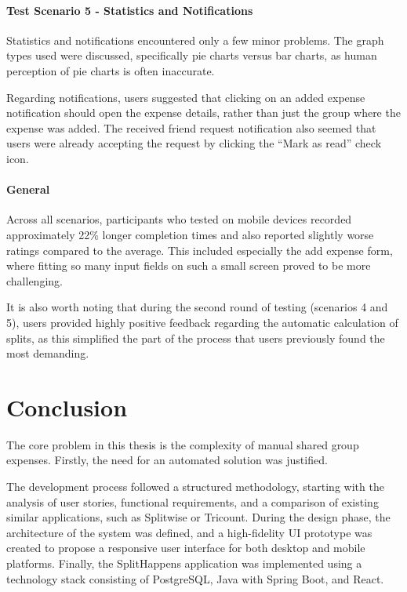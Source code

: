 \documentclass{ctuthesis}
\begin{document}
\subsubsection{Test Scenario 5 - Statistics and Notifications}

Statistics and notifications encountered only a few minor problems. The graph types used were discussed, specifically pie charts versus bar charts, as human perception of pie charts is often inaccurate. 

Regarding notifications, users suggested that clicking on an added expense notification should open the expense details, rather than just the group where the expense was added. The received friend request notification also seemed that users were already accepting the request by clicking the ``Mark as read'' check icon.

\subsubsection{General}
Across all scenarios, participants who tested on mobile devices recorded approximately 22\% longer completion times and also reported slightly worse ratings compared to the average. This included especially the add expense form, where fitting so many input fields on such a small screen proved to be more challenging.

It is also worth noting that during the second round of testing (scenarios 4 and 5), users provided highly positive feedback regarding the automatic calculation of splits, as this simplified the part of the process that users previously found the most demanding.

\chapter{Conclusion}
The core problem in this thesis is the complexity of manual shared group expenses. Firstly, the need for an automated solution was justified.

The development process followed a structured methodology, starting with the analysis of user stories, functional requirements, and a comparison of existing similar applications, such as Splitwise or Tricount. During the design phase, the architecture of the system was defined, and a high-fidelity UI prototype was created to propose a responsive user interface for both desktop and mobile platforms. Finally, the SplitHappens application was implemented using a technology stack consisting of PostgreSQL, Java with Spring Boot, and React.
\end{document}

